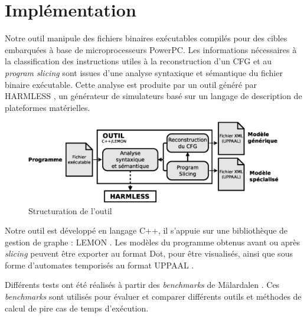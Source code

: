 \section{Implémentation}
\label{sec:implementation}
  

  Notre outil manipule des fichiers binaires exécutables compilés pour des
  cibles embarquées à base de microprocesseurs PowerPC. Les informations
  nécessaires à la classification des instructions utiles à la reconstruction
  d'un CFG et au \emph{program slicing} sont issues d'une analyse syntaxique et
  sémantique du fichier binaire exécutable. Cette analyse est produite par un
  outil généré par HARMLESS \cite{KBB12}, un générateur de simulateurs basé sur
  un langage de description de plateformes matérielles.

  \begin{figure}[ht]
    \centering
    \includegraphics[scale=0.5]{img/archi.eps}
    \caption{Structuration de l'outil}
    \label{fig:implem}
  \end{figure}

    

  Notre outil est développé en langage C++, il s'appuie sur une bibliothèque de
  gestion de graphe : LEMON \cite{DJK11}. Les modèles du programme obtenus avant
  ou après \emph{slicing} peuvent être exporter au format Dot, pour être
  visualisés, ainsi que sous forme d'automates temporisés \cite{AD94} au format
  UPPAAL \cite{LPY97}.
  
  Différents tests ont été réalisés à partir des \emph{benchmarks} de Mälardalen
  \cite{GBA10}. Ces \emph{benchmarks} sont utilisés pour évaluer et comparer
  différents outils et méthodes de calcul de pire cas de temps d'exécution.
